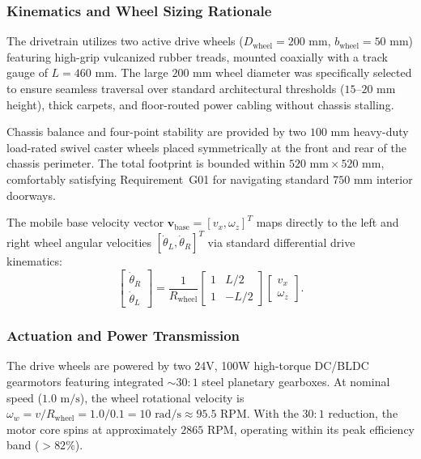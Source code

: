 \subsubsection{Kinematics and Wheel Sizing Rationale}
The drivetrain utilizes two active drive wheels ($D_{\text{wheel}} = 200\text{ mm}$, $b_{\text{wheel}} = 50\text{ mm}$) featuring high-grip vulcanized rubber treads, mounted coaxially with a track gauge of $L = 460\text{ mm}$. The large $200\text{ mm}$ wheel diameter was specifically selected to ensure seamless traversal over standard architectural thresholds ($15\text{--}20\text{ mm}$ height), thick carpets, and floor-routed power cabling without chassis stalling. 

Chassis balance and four-point stability are provided by two $100\text{ mm}$ heavy-duty load-rated swivel caster wheels placed symmetrically at the front and rear of the chassis perimeter. The total footprint is bounded within $520\text{ mm} \times 520\text{ mm}$, comfortably satisfying Requirement~G01 for navigating standard $750\text{ mm}$ interior doorways.

The mobile base velocity vector $\mathbf{v}_{\text{base}} = [v_x, \omega_z]^T$ maps directly to the left and right wheel angular velocities $[\dot{\theta}_L, \dot{\theta}_R]^T$ via standard differential drive kinematics:
\begin{equation}
  \begin{bmatrix} \dot{\theta}_R \\ \dot{\theta}_L \end{bmatrix} = \frac{1}{R_{\text{wheel}}} \begin{bmatrix} 1 & L/2 \\ 1 & -L/2 \end{bmatrix} \begin{bmatrix} v_x \\ \omega_z \end{bmatrix}.
  \label{eq:diff_kinematics}
\end{equation}

\subsubsection{Actuation and Power Transmission}
The drive wheels are powered by two 24V, 100W high-torque DC/BLDC gearmotors featuring integrated $\sim 30:1$ steel planetary gearboxes. At nominal speed ($1.0\text{ m/s}$), the wheel rotational velocity is $\omega_w = v / R_{\text{wheel}} = 1.0 / 0.1 = 10\text{ rad/s} \approx 95.5\text{ RPM}$. With the $30:1$ reduction, the motor core spins at approximately $2865\text{ RPM}$, operating within its peak efficiency band ($>82\%$).

